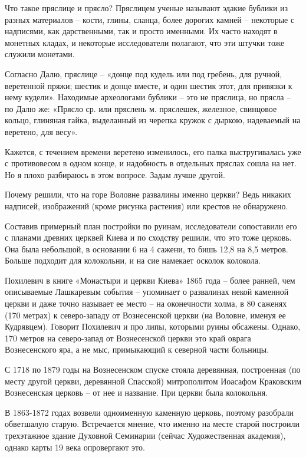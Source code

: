 Что такое пряслице и прясло? Пряслицем ученые называют эдакие бублики из разных материалов – кости, глины, сланца, более дорогих камней – некоторые с надписями, как дарственными, так и просто именными. Их часто находят в монетных кладах, и некоторые исследователи полагают, что эти штучки тоже служили монетами. 

Согласно Далю, пряслице – «донце под кудель или под гребень, для ручной, веретенной пряжи; шестик и донце вместе, и один шестик этот, для привязки к нему кудели». Находимые археологами бублики – это не пряслица, но прясла – по Далю же: «Прясло ср. или пряслень м. пряслешек, железное, свинцовое кольцо, глиняная гайка, выделанный из черепка кружок с дыркою, надеваемый на веретено, для весу».

Кажется, с течением времени веретено изменилось, его палка выстругивалась уже с противовесом в одном конце, и надобность в отдельных пряслах сошла на нет. Но я плохо разбираюсь в этом вопросе. Задам лучше другой.
 
Почему решили, что на горе Воловне развалины именно церкви? Ведь никаких надписей, изображений (кроме рисунка растения) или крестов не обнаружено.

Составив примерный план постройки по руинам, исследователи сопоставили его с планами древних церквей Киева и по сходству решили, что это тоже церковь. Она была небольшой, в основании 6 на 4 сажени, то бишь 12,8 на 8,5 метров. Больше подходит для колокольни, и на сие намекает осколок колокола.

Похилевич в книге «Монастыри и церкви Киева»\cite{pohilmon} 1865 года – более ранней, чем описываемые Лашкаревым события – упоминает о развалинах некой каменной церкви и даже точно называет ее место – на оконечности холма, в 80 саженях (170 метрах) к северо-западу от Вознесенской церкви (на Воловне, именуя ее Кудрявцем). Говорит Похилевич и про липы, которыми руины обсажены. Однако, 170 метров на северо-запад от Вознесенской церкви это край оврага Вознесенского яра, а не мыс, примыкающий к северной части больницы. 

С 1718 по 1879 годы на Вознесенском спуске стояла деревянная, построенная (по месту другой церкви, деревянной Спасской) митрополитом Иоасафом Краковским Вознесенская церковь – от нее и название. При церкви была колокольня. 

В 1863-1872 годах возвели одноименную каменную церковь, поэтому разобрали обветшалую старую. Встречается мнение, что именно на месте старой построили трехэтажное здание Духовной Семинарии (сейчас Художественная академия), однако карты 19 века опровергают это.

